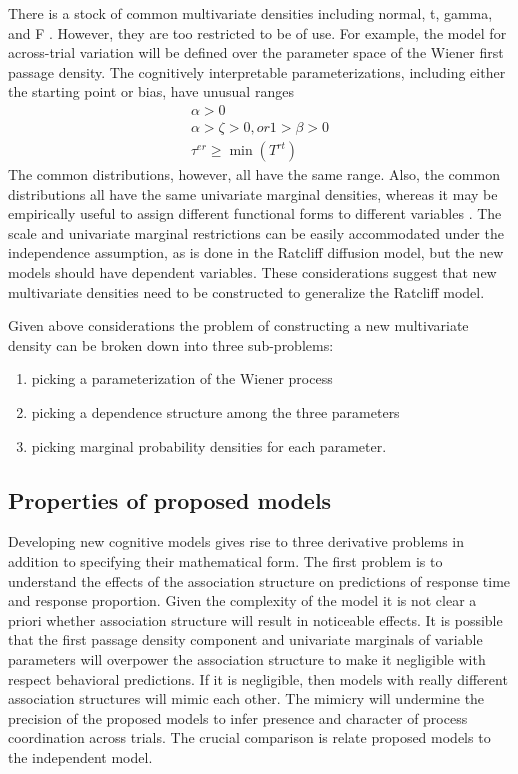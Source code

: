 \documentclass[12pt]{article}
\begin{document}
	There is a stock of common multivariate densities including normal, t, gamma, and F \citep{KotBal2004}. However, they are too restricted to be of use. For example, the model for across-trial variation will be defined over the parameter space of the Wiener first passage density. The cognitively interpretable parameterizations, including either the starting point or bias, have unusual ranges
\begin{gather}
\alpha > 0 \nonumber \\
\alpha > \zeta > 0, or 1 > \beta > 0 \nonumber \\
\tau^{er} \geq \operatorname{min}(T^{rt}) 
\end{gather}
The common distributions, however, all have the same range. Also, the common distributions all have the same univariate marginal densities, whereas it may be empirically useful to assign different functional forms to different variables \citep{Rat2013}. The scale and univariate marginal restrictions can be easily accommodated under the independence assumption, as is done in the Ratcliff diffusion model, but the new models should have dependent variables. These considerations suggest that new multivariate densities need to be constructed to generalize the Ratcliff model.

	Given above considerations the problem of constructing a new multivariate density can be broken down into three sub-problems:
\begin{enumerate}
\item picking a parameterization of the Wiener process
\item picking a dependence structure among the three parameters
\item picking marginal probability densities for each parameter.
\end{enumerate}

\subsection{Properties of proposed models}					     
	Developing new cognitive models gives rise to three derivative problems in addition to specifying their mathematical form. The first problem is to understand the effects of the association structure on predictions of response time and response proportion. Given the complexity of the model it is not clear a priori whether association structure will result in noticeable effects. It is possible that the first passage density component and univariate marginals of variable parameters will overpower the association structure to make it negligible with respect behavioral predictions. If it is negligible, then models with really different association structures will mimic each other. The mimicry will undermine the precision of the proposed models to infer presence and character of process coordination across trials. The crucial comparison is relate proposed models to the independent model.
    
\end{document}
